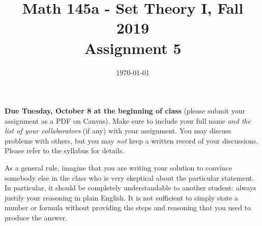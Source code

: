 \documentclass{amsart}
\title[Math 145a, Fall 2019: assignment 5]{Math 145a - Set Theory I, Fall 2019 \\ Assignment 5}
\date{\today}
\theoremstyle{definition}
\begin{document}

\vspace*{-10em}

\maketitle

\textbf{Due Tuesday, October 8 at the beginning of class} (please submit your assignment as a PDF on Canvas). Make sure to include your full name \emph{and the list of your collaborators} (if any) with your assignment. You may discuss problems with others, but you may \emph{not} keep a written record of your discussions. Please refer to the syllabus for details.

As a general rule, imagine that you are writing your solution to convince somebody else in the class who is very skeptical about the particular statement. In particular, it should be completely understandable to another student: always justify your reasoning in plain English. It is not sufficient to simply state a number or formula without providing the steps and reasoning that you used to produce the answer.
\end{document}

